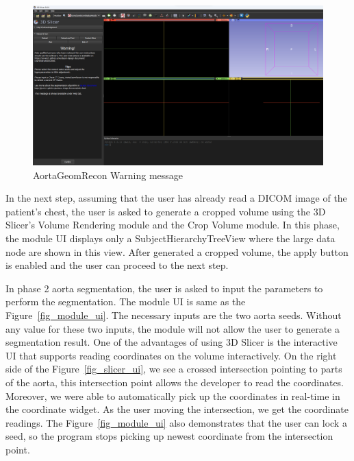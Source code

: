 \begin{figure}[H]
    \centering
    \includegraphics[width=\textwidth]{figures/AGR/AGR_warning.png}
    \caption[AortaGeomRecon Warning message]{AortaGeomRecon Warning message}
    \label{fig_agr_warning}
\end{figure}

In the next step, assuming that the user has already read a DICOM image of the patient's chest, the user is asked to generate a cropped volume using the 3D Slicer's Volume Rendering module and the Crop Volume module. In this phase, the module UI displays only a SubjectHierarchyTreeView where the large data node are shown in this view. After generated a cropped volume, the apply button is enabled and the user can proceed to the next step.

In phase 2 aorta segmentation, the user is asked to input the parameters to perform the segmentation. The module UI is same as the Figure~\ref{fig_module_ui}. The necessary inputs are the two aorta seeds. Without any value for these two inputs, the module will not allow the user to generate a segmentation result. One of the advantages of using 3D Slicer is the interactive UI that supports reading coordinates on the volume interactively. On the right side of the Figure~\ref{fig_slicer_ui}, we see a crossed intersection pointing to parts of the aorta, this intersection point allows the developer to read the coordinates. Moreover, we were able to automatically pick up the coordinates in real-time in the coordinate widget. As the user moving the intersection, we get the coordinate readings. The Figure~\ref{fig_module_ui} also demonstrates that the user can lock a seed, so the program stops picking up newest coordinate from the intersection point.

